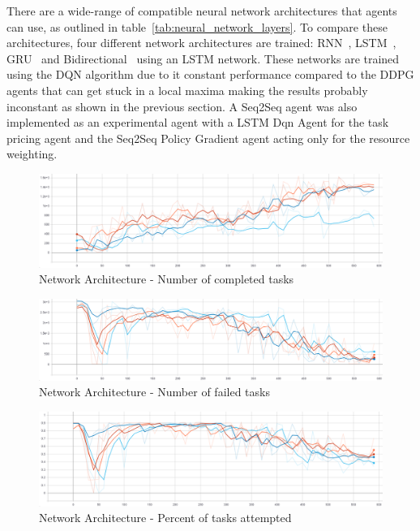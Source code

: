 There are a wide-range of compatible neural network architectures that agents can use, as outlined in
table~\ref{tab:neural_network_layers}. To compare these architectures, four different network architectures are trained:
RNN~\citep{RNN}, LSTM~\citep{LSTM}, GRU~\citep{GRU} and Bidirectional~\citep{Bidirectional} using an LSTM network.
These networks are trained using the DQN algorithm due to it constant performance compared to the DDPG agents that can
get stuck in a local maxima making the results probably inconstant as shown in the previous section. A Seq2Seq agent
was also implemented as an experimental agent with a LSTM Dqn Agent for the task pricing agent and the Seq2Seq Policy
Gradient agent acting only for the resource weighting. \\

\begin{figure}[H]
    \centering
    \includegraphics[width=\linewidth]{figures/5_evaluation_figs/net_arch_training_fig/num_completed_tasks.PNG}
    \caption{Network Architecture - Number of completed tasks}
    \label{fig:net_arch_num_completed_tasks}
\end{figure}

\begin{figure}[H]
    \centering
    \includegraphics[width=\linewidth]{figures/5_evaluation_figs/net_arch_training_fig/num_failed_tasks.png}
    \caption{Network Architecture - Number of failed tasks}
    \label{fig:net_arch_num_failed_tasks}
\end{figure}

\begin{figure}[H]
    \centering
    \includegraphics[width=\linewidth]{figures/5_evaluation_figs/net_arch_training_fig/percent_tasks.png}
    \caption{Network Architecture - Percent of tasks attempted}
    \label{fig:net_arch_percent_tasks}
\end{figure}

